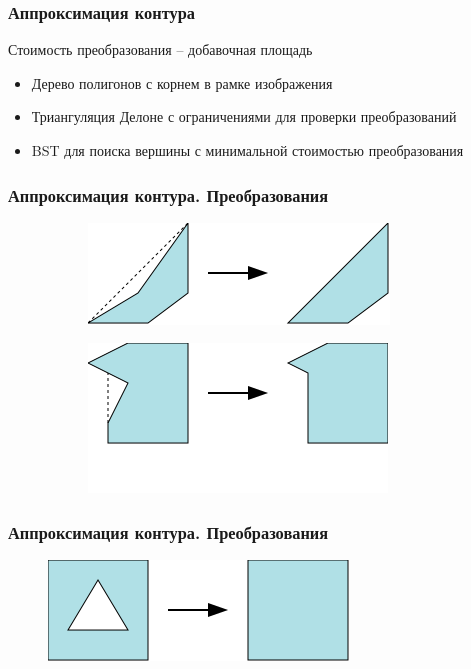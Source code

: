 \documentclass[10pt, unicode]{beamer}
\begin{document}
    \begin{frame}
        \frametitle{Аппроксимация контура}
        Стоимость преобразования -- добавочная площадь
        \begin{itemize}
            \item Дерево полигонов с корнем в рамке изображения
            \item Триангуляция Делоне с ограничениями для проверки преобразований
            \item BST для поиска вершины с минимальной стоимостью преобразования
        \end{itemize}
    \end{frame}
    \begin{frame}
        \frametitle{Аппроксимация контура. Преобразования}
        \begin{figure}[H]
            \centering
            \begin{subfigure}[t]{\linewidth}
                \centering
                \includegraphics[scale=0.8]{images/earcut.png}
            \end{subfigure}
            \begin{subfigure}[b]{\linewidth}
                \centering
                \includegraphics[scale=0.8]{images/bendneighbor.png}
            \end{subfigure}
        \end{figure}
    \end{frame}
    \begin{frame}
        \frametitle{Аппроксимация контура. Преобразования}
        \begin{figure}[H]
            \centering
            \includegraphics[scale=0.8]{images/remove_triangular_hole.png}
        \end{figure}
    \end{frame}
\end{document}
